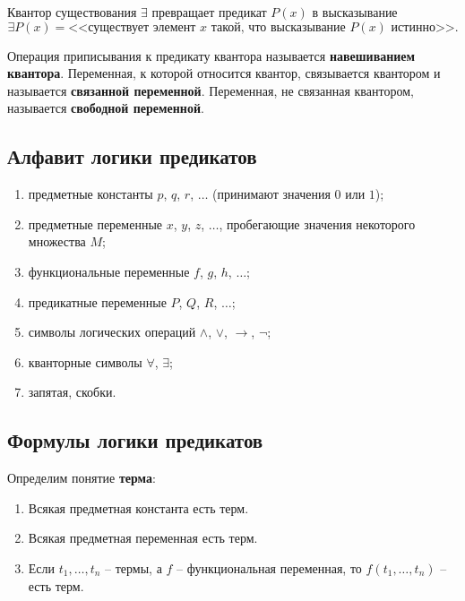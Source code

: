 \documentclass[a5paper, 11pt]{extarticle}
\theoremstyle{definition}
\theoremstyle{definition}
\theoremstyle{definition}
\numberwithin{figure}{section}
\numberwithin{table}{section}
\begin{document}
Квантор существования \(\exists\) превращает предикат \(P(x)\) в высказывание
\[
    \exists P(x) = \text{<<существует элемент \(x\) такой, что высказывание \(P(x)\) истинно>>}.
\]

Операция приписывания к предикату квантора называется \textbf{навешиванием квантора}. Переменная, к которой относится квантор, связывается квантором и называется \textbf{связанной переменной}. Переменная, не связанная квантором, называется \textbf{свободной переменной}.

\subsection{Алфавит логики предикатов}

\begin{enumerate}
    \item предметные константы \(p\), \(q\), \(r\), \(\ldots\) (принимают значения \(0\) или \(1\));
    \item предметные переменные \(x\), \(y\), \(z\), \(\ldots\), пробегающие значения некоторого множества \(M\);
    \item функциональные переменные \(f\), \(g\), \(h\), \(\ldots\);
    \item предикатные переменные \(P\), \(Q\), \(R\), \(\ldots\);
    \item символы логических операций \(\land\), \(\lor\), \(\to\), \(\neg\);
    \item кванторные символы \(\forall\), \(\exists\);
    \item запятая, скобки.
\end{enumerate}

\subsection{Формулы логики предикатов}

\noindent Определим понятие \textbf{терма}:
\begin{enumerate}
    \item Всякая предметная константа есть терм.
    \item Всякая предметная переменная есть терм.
    \item Если \(t_1, \ldots, t_n\) -- термы, а \(f\) -- функциональная переменная, то \(f(t_1, \ldots, t_n)\) -- есть терм.
\end{enumerate}
\end{document}
